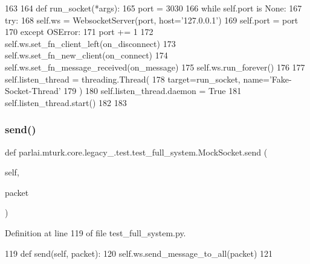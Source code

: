 \begin{DoxyCode}
163 
164         \textcolor{keyword}{def }run\_socket(*args):
165             port = 3030
166             \textcolor{keywordflow}{while} self.port \textcolor{keywordflow}{is} \textcolor{keywordtype}{None}:
167                 \textcolor{keywordflow}{try}:
168                     self.ws = WebsocketServer(port, host=\textcolor{stringliteral}{'127.0.0.1'})
169                     self.port = port
170                 \textcolor{keywordflow}{except} OSError:
171                     port += 1
172             self.ws.set\_fn\_client\_left(on\_disconnect)
173             self.ws.set\_fn\_new\_client(on\_connect)
174             self.ws.set\_fn\_message\_received(on\_message)
175             self.ws.run\_forever()
176 
177         self.listen\_thread = threading.Thread(
178             target=run\_socket, name=\textcolor{stringliteral}{'Fake-Socket-Thread'}
179         )
180         self.listen\_thread.daemon = \textcolor{keyword}{True}
181         self.listen\_thread.start()
182 
183 
\end{DoxyCode}
\mbox{\label{classparlai_1_1mturk_1_1core_1_1legacy__2018_1_1test_1_1test__full__system_1_1MockSocket_abd0988fb013adc98c3ff1b4d1ed40402}} 
\subsubsection{\texorpdfstring{send()}{send()}}
{\footnotesize\ttfamily def parlai.\+mturk.\+core.\+legacy\+\_.\+test.\+test\+\_\+full\+\_\+system.\+Mock\+Socket.\+send (\begin{DoxyParamCaption}\item[{}]{self,  }\item[{}]{packet }\end{DoxyParamCaption})}



Definition at line 119 of file test\+\_\+full\+\_\+system.\+py.


\begin{DoxyCode}
119     \textcolor{keyword}{def }send(self, packet):
120         self.ws.send\_message\_to\_all(packet)
121 
\end{DoxyCode}


